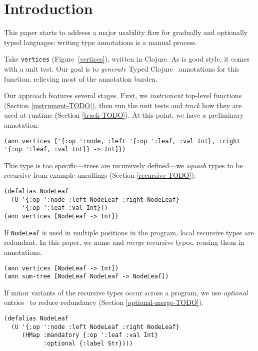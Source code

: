 \section{Introduction}


This paper starts to address a major usability flaw
for gradually and optionally typed languages:
writing type annotations is a manual process.

Take \texttt{vertices} (Figure~\ref{vertices}),
written in Clojure.
As is good style, it comes with a unit test.
Our goal is to \textit{generate} Typed Clojure~\cite{typed-clojure}
annotations
for this function, relieving most of the annotation
burden.

Our approach features several stages.
First, we \textit{instrument} top-level functions
(Section \ref{instrument-TODO}),
then run the unit tests and \textit{track}
how they are used at runtime
(Section \ref{track-TODO}).
At this point, we have a preliminary
annotation:
%
\begin{Verbatim}
(ann vertices ['{:op ':node, :left '{:op ':leaf, :val Int}, :right '{:op ':leaf, :val Int}} -> Int]})
\end{Verbatim}
%
This type is too specific---trees are recursively
defined---we \textit{squash} types to be
recursive from example unrollings (Section \ref{recursive-TODO}):

\begin{Verbatim}
(defalias NodeLeaf 
  (U '{:op ':node :left NodeLeaf :right NodeLeaf}
     '{:op ':leaf :val Int}))
(ann vertices [NodeLeaf -> Int])
\end{Verbatim}
%
%
If \texttt{NodeLeaf} is used in multiple positions
in the program, local recursive types are redundant.
In this paper, we name and \textit{merge} recursive
types, reusing them in annotations.
%
\begin{Verbatim}
(ann vertices [NodeLeaf -> Int])
(ann sum-tree [NodeLeaf NodeLeaf -> NodeLeaf])
\end{Verbatim}
%
If minor variants of the recursive types occur
across a program,
we use \textit{optional} entries~\cite{typed-clojure}
to reduce redundancy (Section \ref{optional-merge-TODO}).
%
\begin{Verbatim}
(defalias NodeLeaf 
  (U '{:op ':node :left NodeLeaf :right NodeLeaf}
     (HMap :mandatory {:op ':leaf :val Int}
           :optional {:label Str})))
\end{Verbatim}

